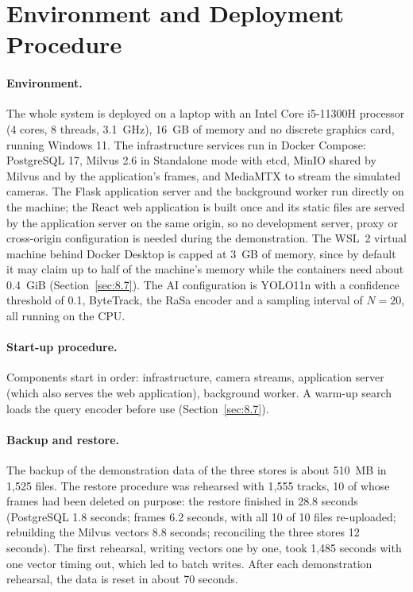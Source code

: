 \section{Environment and Deployment Procedure}
\label{sec:7.1}
\label{sec:7.3}

\paragraph{Environment.} The whole system is deployed on a laptop with an Intel Core i5-11300H processor (4 cores, 8 threads, 3.1~GHz), 16~GB of memory and no discrete graphics card, running Windows 11. The infrastructure services run in Docker Compose: PostgreSQL 17, Milvus 2.6 in Standalone mode with etcd, MinIO shared by Milvus and by the application's frames, and MediaMTX to stream the simulated cameras. The Flask application server and the background worker run directly on the machine; the React web application is built once and its static files are served by the application server on the same origin, so no development server, proxy or cross-origin configuration is needed during the demonstration. The WSL~2 virtual machine behind Docker Desktop is capped at 3~GB of memory, since by default it may claim up to half of the machine's memory while the containers need about 0.4~GiB (Section~\ref{sec:8.7}). The AI configuration is YOLO11n with a confidence threshold of 0.1, ByteTrack, the RaSa encoder and a sampling interval of $N = 20$, all running on the CPU.

\paragraph{Start-up procedure.} Components start in order: infrastructure, camera streams, application server (which also serves the web application), background worker. A warm-up search loads the query encoder before use (Section~\ref{sec:8.7}).

\paragraph{Backup and restore.} The backup of the demonstration data of the three stores is about 510~MB in 1,525 files. The restore procedure was rehearsed with 1,555 tracks, 10 of whose frames had been deleted on purpose: the restore finished in 28.8 seconds (PostgreSQL 1.8 seconds; frames 6.2 seconds, with all 10 of 10 files re-uploaded; rebuilding the Milvus vectors 8.8 seconds; reconciling the three stores 12 seconds). The first rehearsal, writing vectors one by one, took 1,485 seconds with one vector timing out, which led to batch writes. After each demonstration rehearsal, the data is reset in about 70 seconds.
